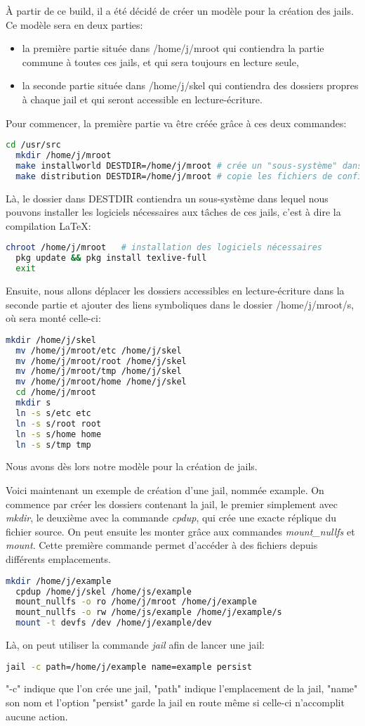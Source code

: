 \documentclass[10pt,a4paper]{article}
\begin{document}
À partir de ce build, il a été décidé de créer un modèle pour la création des jails. Ce modèle sera en deux parties:
\begin{itemize}
  \item la première partie située dans /home/j/mroot qui contiendra la partie commune à toutes ces jails, et qui sera toujours en lecture seule,
  \item la seconde partie située dans /home/j/skel qui contiendra des dossiers propres à chaque jail et qui seront accessible en lecture-écriture.
\end{itemize}
Pour commencer, la première partie va être créée grâce à ces deux commandes:
\begin{lstlisting}[language=bash]
  cd /usr/src
  mkdir /home/j/mroot
  make installworld DESTDIR=/home/j/mroot # crée un "sous-système" dans le dossier DESTDIR
  make distribution DESTDIR=/home/j/mroot # copie les fichiers de configuration dans la jail
\end{lstlisting}
Là, le dossier dans DESTDIR contiendra un sous-système dans lequel nous pouvons installer les logiciels nécessaires aux tâches de ces jails, c'est à dire la compilation \LaTeX:
\begin{lstlisting}[language=bash]
  chroot /home/j/mroot   # installation des logiciels nécessaires
  pkg update && pkg install texlive-full
  exit
\end{lstlisting}
Ensuite, nous allons déplacer les dossiers accessibles en lecture-écriture dans la seconde partie et ajouter des liens symboliques dans le dossier /home/j/mroot/s, où sera monté celle-ci:
\begin{lstlisting}[language=bash]
  mkdir /home/j/skel
  mv /home/j/mroot/etc /home/j/skel
  mv /home/j/mroot/root /home/j/skel
  mv /home/j/mroot/tmp /home/j/skel
  mv /home/j/mroot/home /home/j/skel
  cd /home/j/mroot
  mkdir s
  ln -s s/etc etc
  ln -s s/root root
  ln -s s/home home
  ln -s s/tmp tmp
\end{lstlisting}
Nous avons dès lors notre modèle pour la création de jails.

Voici maintenant un exemple de création d'une jail, nommée example. On commence par créer les dossiers contenant la jail, le premier simplement avec \emph{mkdir}, le deuxième avec la commande \emph{cpdup}, qui crée une exacte réplique du fichier source. On peut ensuite les monter grâce aux commandes \emph{mount_nullfs} et \emph{mount}. Cette première commande permet d'accéder à des fichiers depuis différents emplacements.
\begin{lstlisting}[language=bash]
  mkdir /home/j/example
  cpdup /home/j/skel /home/js/example
  mount_nullfs -o ro /home/j/mroot /home/j/example
  mount_nullfs -o rw /home/js/example /home/j/example/s
  mount -t devfs /dev /home/j/example/dev
\end{lstlisting}
Là, on peut utiliser la commande \emph{jail} afin de lancer une jail:
\begin{lstlisting}[language=bash]
  jail -c path=/home/j/example name=example persist
\end{lstlisting}
"-c" indique que l'on crée une jail, "path" indique l'emplacement de la jail, "name" son nom et l'option "persist" garde la jail en route même si celle-ci n'accomplit aucune action.
\end{document}
